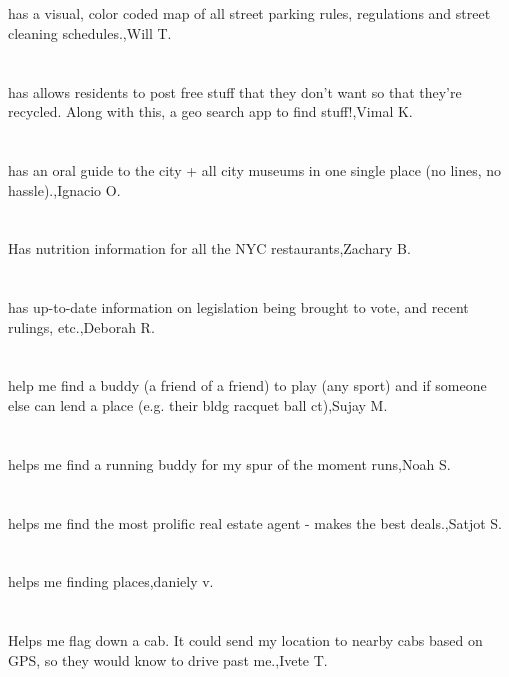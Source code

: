 \section{}has a visual, color coded map of all street parking rules, regulations and street cleaning schedules.,Will T.	
\section{}has allows residents to post free stuff that they don't want so that they're recycled.  Along with this, a geo search app to find stuff!,Vimal K.	
\section{}has an oral guide to the city + all city museums in one single place (no lines, no hassle).,Ignacio O.	
\section{}Has nutrition information for all the NYC restaurants,Zachary B.	
\section{}has up-to-date information on legislation being brought to vote, and recent rulings, etc.,Deborah R.	
\section{}help me find a buddy (a friend of a friend) to play (any sport) and if someone else can lend a place (e.g. their bldg racquet ball ct),Sujay M.	
\section{}helps me find a running buddy for my spur of the moment runs,Noah S.	
\section{}helps me find the most prolific real estate agent - makes the best deals.,Satjot S.	
\section{}helps me finding places,daniely v.	
\section{}Helps me flag down a cab. It could send my location to nearby cabs based on GPS, so they would know to drive past me.,Ivete T.	
